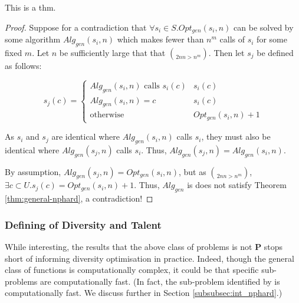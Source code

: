 \begin{theorem}\label{thm:general-nphard}
    This is a thm.
\end{theorem}

\begin{proof}
Suppose for a contradiction that $\forall s_i \in S . Opt_{gen}(s_i, n)$ can be solved by some algorithm $Alg_{gen}(s_i, n)$ which makes fewer than $n^m$ calls of $s_i$ for some fixed $m$. Let $n$ be sufficiently large that that $\choose{2n}{n} > n^m$. Then let $s_j$ be defined as follows:

\begin{equation}
s_j(c) = 
    \begin{cases} 
        Alg_{gen}(s_i, n) \text{ calls } s_i(c) & s_i(c) \\
        Alg_{gen}(s_i, n) = c & s_i(c)          \\
        \text{otherwise} & Opt_{gen}(s_i, n) + 1 
    \end{cases}
\end{equation}

\noindent As $s_i$ and $s_j$ are identical where $Alg_{gen}(s_i, n)$ calls $s_i$, they must also be identical where $Alg_{gen}(s_j, n)$ calls $s_i$. Thus, $Alg_{gen}(s_j, n) = Alg_{gen}(s_i, n)$.

By assumption, $Alg_{gen}(s_j, n) = Opt_{gen}(s_i, n)$, but as $\choose{2n}{n} > n^m$, $\exists c \subset U . s_j(c) = Opt_{gen}(s_i, n) + 1$. Thus, $Alg_{gen}$ is does not satisfy Theorem \ref{thm:general-nphard}, a contradiction!
\end{proof}

\subsubsection{Defining of Diversity and Talent}\label{subsubsec:div_talent_def}
While interesting, the results that the above class of problems is not $\mathbf{P}$ stops short of informing diversity optimisation in practice. Indeed, though the general class of functions is computationally complex, it could be that specific sub-problems are computationally fast. (In fact, the sub-problem identified by \textcite{kleinberg2018algorithmic} is computationally fast. We discuss further in Section \ref{subsubsec:int_nphard}.)

